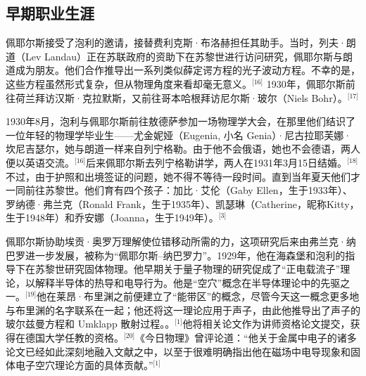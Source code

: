 \subsection{早期职业生涯}
佩耶尔斯接受了泡利的邀请，接替费利克斯·布洛赫担任其助手。当时，列夫·朗道（Lev Landau）正在苏联政府的资助下在苏黎世进行访问研究，佩耶尔斯与朗道成为朋友。他们合作推导出一系列类似薛定谔方程的光子波动方程。不幸的是，这些方程虽然形式复杂，但从物理角度来看却毫无意义。\(^\text{[16]}\)
1930年，佩耶尔斯前往荷兰拜访汉斯·克拉默斯，又前往哥本哈根拜访尼尔斯·玻尔（Niels Bohr）。\(^\text{[17]}\)

1930年8月，泡利与佩耶尔斯前往敖德萨参加一场物理学大会，在那里他们结识了一位年轻的物理学毕业生——尤金妮娅（Eugenia, 小名 Genia）·尼古拉耶芙娜·坎尼吉瑟尔，她与朗道一样来自列宁格勒。由于他不会俄语，她也不会德语，两人便以英语交流。\(^\text{[16]}\)后来佩耶尔斯去列宁格勒讲学，两人在1931年3月15日结婚。\(^\text{[18]}\)不过，由于护照和出境签证的问题，她不得不等待一段时间。直到当年夏天他们才一同前往苏黎世。他们育有四个孩子：加比·艾伦（Gaby Ellen，生于1933年）、罗纳德·弗兰克（Ronald Frank，生于1935年）、凯瑟琳（Catherine，昵称Kitty，生于1948年）和乔安娜（Joanna，生于1949年）。\(^\text{[3]}\)

佩耶尔斯协助埃贡·奥罗万理解使位错移动所需的力，这项研究后来由弗兰克·纳巴罗进一步发展，被称为“佩耶尔斯–纳巴罗力”。1929年，他在海森堡和泡利的指导下在苏黎世研究固体物理。他早期关于量子物理的研究促成了“正电载流子”理论，以解释半导体的热导和电导行为。他是“空穴”概念在半导体理论中的先驱之一。\(^\text{[19]}\)他在莱昂·布里渊之前便建立了“能带区”的概念，尽管今天这一概念更多地与布里渊的名字联系在一起；他还将这一理论应用于声子，由此他推导出了声子的玻尔兹曼方程和 Umklapp 散射过程。。\(^\text{[1]}\)他将相关论文作为讲师资格论文提交，获得在德国大学任教的资格。\(^\text{[20]}\)《今日物理》曾评论道：“他关于金属中电子的诸多论文已经如此深刻地融入文献之中，以至于很难明确指出他在磁场中电导现象和固体电子空穴理论方面的具体贡献。”\(^\text{[1]}\)

